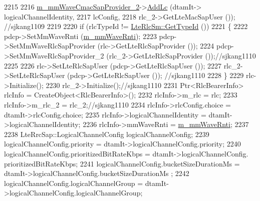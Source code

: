 \begin{DoxyCode}
2215 
2216               \hyperlink{classns3_1_1LteUeRrc_ad57849b84ca3da54a2a85ab91c63327b}{m\_mmWaveCmacSapProvider\_2}->\hyperlink{classns3_1_1LteUeCmacSapProvider_a62f2d731c336ca14e98e95a3215e92ec}{AddLc} (dtamIt->
      logicalChannelIdentity,
2217                                       lcConfig,
2218                                       rlc\_2->GetLteMacSapUser ()); \textcolor{comment}{//sjkang1109}
2219 
2220               \textcolor{keywordflow}{if} (rlcTypeId != \hyperlink{classns3_1_1LteRlcSm_a160bd39ce4e0d113dd5d93cc3a258045}{LteRlcSm::GetTypeId} ())
2221               \{
2222                 pdcp->SetMmWaveRnti (\hyperlink{classns3_1_1LteUeRrc_a0bd0d5c3b49624be1fd217f96910f56a}{m\_mmWaveRnti});
2223                 pdcp->SetMmWaveRlcSapProvider (rlc->GetLteRlcSapProvider ());
2224                 pdcp->SetMmWaveRlcSapProvider\_2 (rlc\_2->GetLteRlcSapProvider ());\textcolor{comment}{//sjkang1110}
2225 
2226                 rlc->SetLteRlcSapUser (pdcp->GetLteRlcSapUser ());
2227                 rlc\_2->SetLteRlcSapUser (pdcp->GetLteRlcSapUser ()); \textcolor{comment}{//sjkang1110}
2228               \} 
2229               rlc->Initialize();
2230               rlc\_2->Initialize();\textcolor{comment}{//sjkang1110}
2231               Ptr<RlcBearerInfo> rlcInfo = CreateObject<RlcBearerInfo>();
2232               rlcInfo->m\_rlc = rlc;
2233               rlcInfo->m\_rlc\_2 = rlc\_2;\textcolor{comment}{//sjkang1110}
2234               rlcInfo->rlcConfig.choice = dtamIt->rlcConfig.choice;
2235               rlcInfo->logicalChannelIdentity = dtamIt->logicalChannelIdentity;
2236               rlcInfo->mmWaveRnti = \hyperlink{classns3_1_1LteUeRrc_a0bd0d5c3b49624be1fd217f96910f56a}{m\_mmWaveRnti};
2237 
2238               LteRrcSap::LogicalChannelConfig logicalChannelConfig;
2239               logicalChannelConfig.priority = dtamIt->logicalChannelConfig.priority;
2240               logicalChannelConfig.prioritizedBitRateKbps = dtamIt->logicalChannelConfig.
      prioritizedBitRateKbps;
2241               logicalChannelConfig.bucketSizeDurationMs = dtamIt->logicalChannelConfig.bucketSizeDurationMs
      ;
2242               logicalChannelConfig.logicalChannelGroup = dtamIt->logicalChannelConfig.logicalChannelGroup; 
       

\end{DoxyCode}
